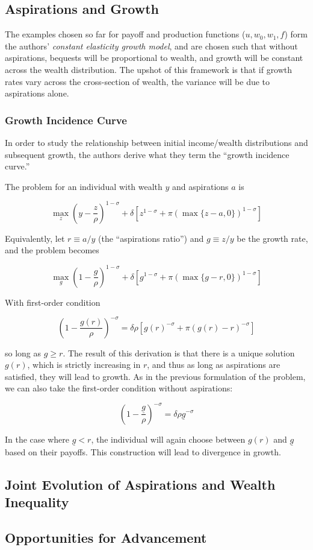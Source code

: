 \documentclass[]{article}
\begin{document}
\subsection{Aspirations and Growth}\label{aspirations-and-growth}

The examples chosen so far for payoff and production functions
(\(u, w_0, w_1, f\)) form the authors' \emph{constant elasticity growth
model}, and are chosen such that without aspirations, bequests will be
proportional to wealth, and growth will be constant across the wealth
distribution. The upshot of this framework is that if growth rates vary
across the cross-section of wealth, the variance will be due to
aspirations alone.

\subsubsection{Growth Incidence Curve}\label{growth-incidence-curve}

In order to study the relationship between initial income/wealth
distributions and subsequent growth, the authors derive what they term
the ``growth incidence curve.''

The problem for an individual with wealth \(y\) and aspirations \(a\) is

\[\max_z \left(y - \frac{z}{\rho}\right)^{1 - \sigma} + \delta\left[z^{1 - \sigma} + \pi \left(\max\{z - a, 0\}\right)^{1 - \sigma}\right]\]

Equivalently, let \(r\equiv a/y\) (the ``aspirations ratio'') and
\(g\equiv z/y\) be the growth rate, and the problem becomes

\[\max_g \left(1 - \frac{g}{\rho}\right)^{1 - \sigma} + \delta\left[g^{1 - \sigma} + \pi \left(\max\{g - r, 0\}\right)^{1 - \sigma}\right]\]

With first-order condition

\[\left(1 - \frac{g(r)}{\rho}\right)^{- \sigma} = \delta\rho\left[g(r)^{- \sigma} + \pi \left(g(r) - r\right)^{-\sigma}\right]\]

so long as \(g\geq r\). The result of this derivation is that there is a
unique solution \(g(r)\), which is strictly increasing in \(r\), and
thus as long as aspirations are satisfied, they will lead to growth. As
in the previous formulation of the problem, we can also take the
first-order condition without aspirations:

\[\left(1 - \frac{\underline{g}}{\rho}\right)^{-\sigma} = \delta\rho \underline{g}^{-\sigma} \]

In the case where \(\underline{g}< r\), the individual will again choose
between \(g(r)\) and \(\underline{g}\) based on their payoffs. This
construction will lead to divergence in growth.

\subsection{Joint Evolution of Aspirations and Wealth
Inequality}\label{joint-evolution-of-aspirations-and-wealth-inequality}

\subsection{Opportunities for
Advancement}\label{opportunities-for-advancement}
\end{document}
